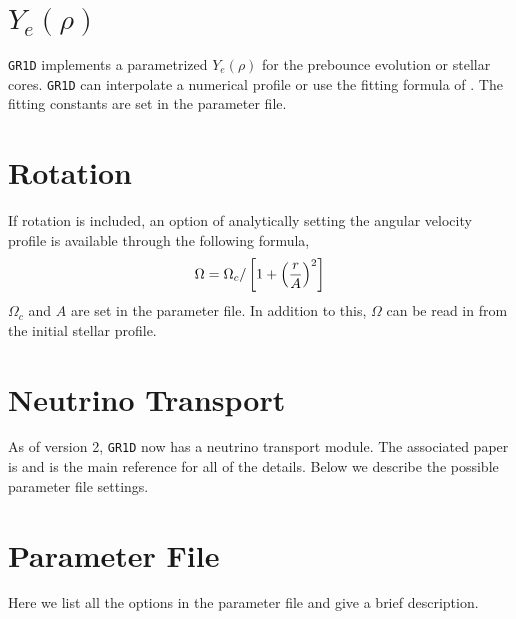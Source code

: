 \documentclass[10pt,nofootinbib]{article}
\newcommand{\code}[1]{\texttt{#1}}
\begin{document}
\section{$Y_e(\rho)$}
\label{sec:yeofrhofit}
\code{GR1D} implements a parametrized $Y_e(\rho)$ for the prebounce
evolution or stellar cores.  \code{GR1D} can interpolate a numerical
profile or use the fitting formula of \cite{liebendoerfer:05fakenu}.  The
fitting constants are set in the parameter file.

\section{Rotation}
If rotation is included, an option of analytically setting the angular
velocity profile is available through the following formula,
\begin{equation}
\Omega = \Omega_c / \left[ 1 + \left({r \over A}\right)^2\right]
\label{eq:omega}
\end{equation}
$\Omega_c$ and $A$ are set in the parameter file.  In addition to
this, $\Omega$ can be read in from the initial stellar profile.

\section{Neutrino Transport}

As of version 2, \code{GR1D} now has a neutrino transport module.  The
associated paper is \cite{oconnor:14} and is the main reference for
all of the details. Below we describe the possible parameter file settings.

\section{Parameter File}
Here we list all the options in the parameter file and give a brief
description. 
\end{document}
